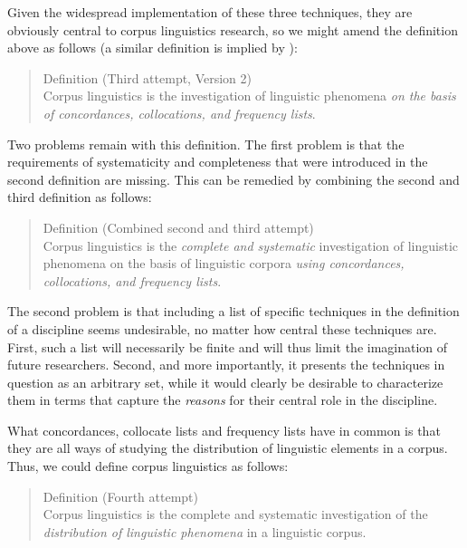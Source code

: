 Given the widespread implementation of these three techniques, they are obviously central to corpus linguistics research, so we might amend the definition above as follows (a similar definition is implied by \citet[244--258]{kennedy_introduction_1998}):

\begin{quotation}
Definition (Third attempt, Version 2) \\
Corpus linguistics is the investigation of linguistic phenomena \emph{on the basis of concordances,  collocations,  and frequency  lists}.
\end{quotation}

Two problems remain with this definition. The first problem is that the requirements of systematicity and completeness that were introduced in the second definition are missing. This can be remedied by combining the second and third definition as follows:

\begin{quotation}
Definition (Combined second and third attempt) \\
Corpus linguistics is the \emph{complete and systematic} investigation of linguistic phenomena on the basis of linguistic corpora \emph{using concordances,  collocations, and frequency  lists}.
\end{quotation}

The second problem is that including a list of specific techniques in the definition of a discipline seems undesirable, no matter how central these techniques are. First, such a list will necessarily be finite and will thus limit the imagination of future researchers. Second, and more importantly, it presents the techniques in question as an arbitrary set, while it would clearly be desirable to characterize them in terms that capture the \emph{reasons} for their central role in the discipline.

What concordances,  collocate  lists and frequency  lists have in common is that they are all ways of studying the distribution  of linguistic elements in a corpus. Thus, we could define corpus linguistics as follows:

\begin{quotation}
Definition (Fourth attempt) \\
Corpus linguistics is the complete and systematic investigation of the \emph{distribution  of linguistic phenomena} in a linguistic corpus.
\end{quotation}

